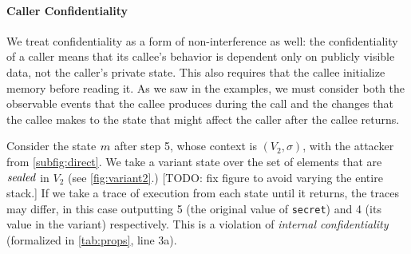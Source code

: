 \documentclass[10pt,conference]{ieeetran}%
\theoremstyle{definition}
\begin{document}
\paragraph*{Caller Confidentiality}

We treat confidentiality as a form of non-interference as well: the confidentiality of a caller
means that its callee's behavior is dependent only on publicly visible data,
not the caller's private state. This also requires that the callee initialize
memory before reading it.
As we saw in the examples, we must consider both the observable events
that the callee produces during the call and the changes that the callee makes to the state that might
affect the caller after the callee returns.

Consider the state \(m\) after step 5, whose context is \((V_2,\sigma)\), with the attacker from
\cref{subfig:direct}. We take a variant state over the set of elements that are
\(\mathit{sealed}\) in \(V_2\) (see \cref{fig:variant2}.)
            [TODO: fix figure to avoid varying the entire stack.]
If we take a trace of execution from each state until it returns,
the traces may differ, in this case outputting 5 (the original value of {\tt secret}) and
4 (its value in the variant) respectively. This is a violation of
{\it internal confidentiality} (formalized in \cref{tab:props}, line 3a).

\newcommand{\leftbox}[1][]{\genbox{20px}{\leftvariant}{#1}}
\newcommand{\rightbox}[1][]{\genbox{20px}{\rightvariant}{#1}}
\end{document}
